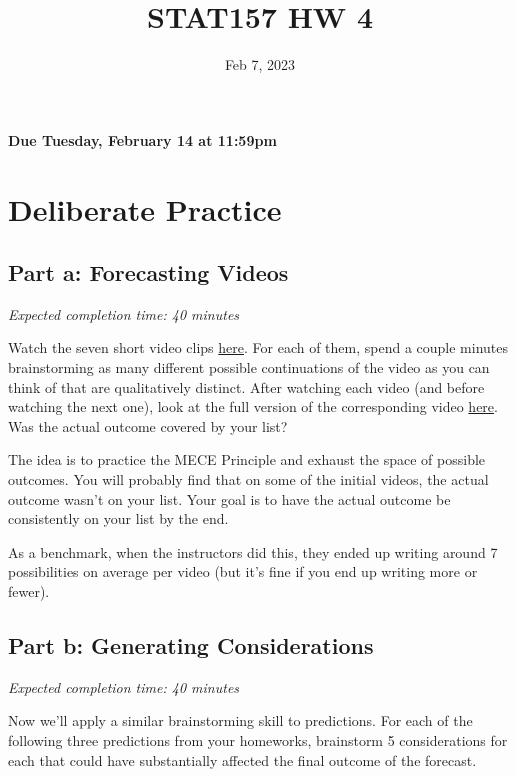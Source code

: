 \documentclass[11pt]{article}
\title{STAT157 HW 4}
\date{Feb 7, 2023}
\begin{document}
\maketitle

\hfill \textbf{Due Tuesday, February 14 at 11:59pm}

\section*{Deliberate Practice}

\subsection*{Part a: Forecasting Videos}

\emph{Expected completion time: 40 minutes}

Watch the seven short video clips \href{http://www.stat157.com/assets/initial_clips.zip}{here}. For each of them, spend a couple minutes brainstorming as many different 
possible continuations of the video as you can think of that are qualitatively distinct. After watching each video (and before watching the next one), look at the 
full version of the corresponding video \href{http://www.stat157.com/assets/full_videos.zip}{here}. Was the actual outcome covered by your list?

The idea is to practice the MECE Principle and exhaust the space of possible outcomes. You will probably find that on some of the initial videos, the actual outcome wasn't on your list. 
Your goal is to have the actual outcome be consistently on your list by the end.

As a benchmark, when the instructors did this, they ended up writing around 7 possibilities on average per video (but it's fine if you end up writing more or fewer).


\subsection*{Part b: Generating Considerations}

\emph{Expected completion time: 40 minutes}

Now we'll apply a similar brainstorming skill to predictions. 
For each of the following three predictions from your homeworks, brainstorm 5 considerations for each that could have substantially affected the final outcome of the forecast.
\end{document}
